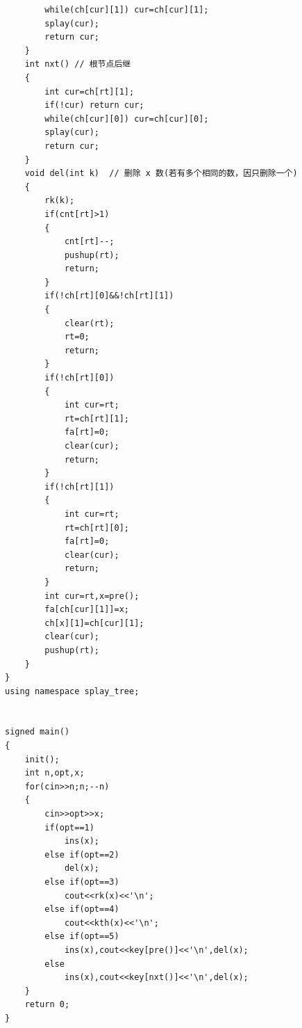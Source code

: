 \begin{verbatim}
        while(ch[cur][1]) cur=ch[cur][1];
        splay(cur);
        return cur;
    }
    int nxt() // 根节点后继
    {
        int cur=ch[rt][1];
        if(!cur) return cur;
        while(ch[cur][0]) cur=ch[cur][0];
        splay(cur);
        return cur;
    }
    void del(int k)  // 删除 x 数(若有多个相同的数，因只删除一个)
    {
        rk(k);
        if(cnt[rt]>1)
        {
            cnt[rt]--;
            pushup(rt);
            return;
        }
        if(!ch[rt][0]&&!ch[rt][1])
        {
            clear(rt);
            rt=0;
            return;
        }
        if(!ch[rt][0])
        {
            int cur=rt;
            rt=ch[rt][1];
            fa[rt]=0;
            clear(cur);
            return;
        }
        if(!ch[rt][1])
        {
            int cur=rt;
            rt=ch[rt][0];
            fa[rt]=0;
            clear(cur);
            return;
        }
        int cur=rt,x=pre();
        fa[ch[cur][1]]=x;
        ch[x][1]=ch[cur][1];
        clear(cur);
        pushup(rt);
    }
}
using namespace splay_tree;


signed main()
{
    init();
    int n,opt,x;
    for(cin>>n;n;--n)
    {
        cin>>opt>>x;
        if(opt==1)
            ins(x);
        else if(opt==2)
            del(x);
        else if(opt==3)
            cout<<rk(x)<<'\n';
        else if(opt==4)
            cout<<kth(x)<<'\n';
        else if(opt==5)
            ins(x),cout<<key[pre()]<<'\n',del(x);
        else
            ins(x),cout<<key[nxt()]<<'\n',del(x);
    }
    return 0;
}
\end{verbatim}


